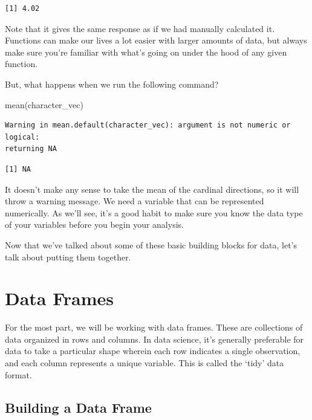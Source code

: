 \documentclass[
  letterpaper,
  DIV=11,
  numbers=noendperiod]{scrreprt}
\newenvironment{Shaded}{\begin{snugshade}}{\end{snugshade}}
\newcommand{\FunctionTok}[1]{\textcolor[rgb]{0.28,0.35,0.67}{#1}}
\newcommand{\NormalTok}[1]{\textcolor[rgb]{0.00,0.23,0.31}{#1}}
\begin{document}
\begin{verbatim}
[1] 4.02
\end{verbatim}

Note that it gives the same response as if we had manually calculated
it. Functions can make our lives a lot easier with larger amounts of
data, but always make sure you're familiar with what's going on under
the hood of any given function.

But, what happens when we run the following command?

\begin{Shaded}
\begin{Highlighting}[]
\FunctionTok{mean}\NormalTok{(character\_vec)}
\end{Highlighting}
\end{Shaded}

\begin{verbatim}
Warning in mean.default(character_vec): argument is not numeric or logical:
returning NA
\end{verbatim}

\begin{verbatim}
[1] NA
\end{verbatim}

It doesn't make any sense to take the mean of the cardinal directions,
so it will throw a warning message. We need a variable that can be
represented numerically. As we'll see, it's a good habit to make sure
you know the data type of your variables before you begin your analysis.

Now that we've talked about some of these basic building blocks for
data, let's talk about putting them together.

\section{Data Frames}\label{data-frames}

For the most part, we will be working with data frames. These are
collections of data organized in rows and columns. In data science, it's
generally preferable for data to take a particular shape wherein each
row indicates a single observation, and each column represents a unique
variable. This is called the `tidy' data format.

\subsection{Building a Data Frame}\label{building-a-data-frame}
\end{document}
